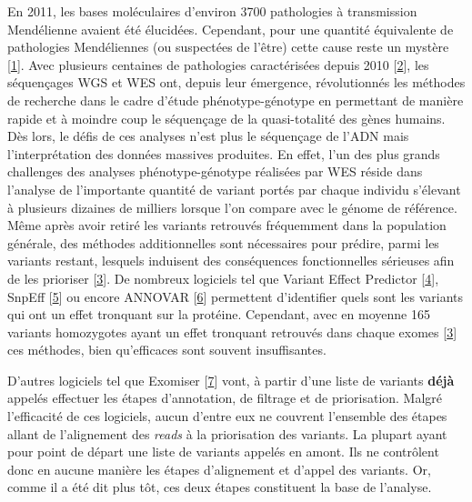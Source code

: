 \documentclass[12pt,twoside]{reedthesis}
\theoremstyle{definition}
\theoremstyle{definition}
\theoremstyle{remark}
\begin{document}
  En 2011, les bases moléculaires d'environ 3700 pathologies à
  transmission Mendélienne avaient été élucidées. Cependant, pour une
  quantité équivalente de pathologies Mendéliennes (ou suspectées de
  l'être) cette cause reste un mystère
  {[}\protect\hyperlink{ref-Amberger2011}{1}{]}. Avec plusieurs centaines
  de pathologies caractérisées depuis 2010
  {[}\protect\hyperlink{ref-Ng}{2}{]}, les séquençages WGS et WES ont,
  depuis leur émergence, révolutionnés les méthodes de recherche dans le
  cadre d'étude phénotype-génotype en permettant de manière rapide et à
  moindre coup le séquençage de la quasi-totalité des gènes humains. Dès
  lors, le défis de ces analyses n'est plus le séquençage de l'ADN mais
  l'interprétation des données massives produites. En effet, l'un des plus
  grands challenges des analyses phénotype-génotype réalisées par WES
  réside dans l'analyse de l'importante quantité de variant portés par
  chaque individu s'élevant à plusieurs dizaines de milliers lorsque l'on
  compare avec le génome de référence. Même après avoir retiré les
  variants retrouvés fréquemment dans la population générale, des méthodes
  additionnelles sont nécessaires pour prédire, parmi les variants
  restant, lesquels induisent des conséquences fonctionnelles sérieuses
  afin de les prioriser {[}\protect\hyperlink{ref-Pelak2010}{3}{]}. De
  nombreux logiciels tel que Variant Effect Predictor
  {[}\protect\hyperlink{ref-McLaren2016}{4}{]}, SnpEff
  {[}\protect\hyperlink{ref-Cingolani2012}{5}{]} ou encore ANNOVAR
  {[}\protect\hyperlink{ref-Wang2010}{6}{]} permettent d'identifier quels
  sont les variants qui ont un effet tronquant sur la protéine. Cependant,
  avec en moyenne 165 variants homozygotes ayant un effet tronquant
  retrouvés dans chaque exomes {[}\protect\hyperlink{ref-Pelak2010}{3}{]}
  ces méthodes, bien qu'efficaces sont souvent insuffisantes.
  
  D'autres logiciels tel que Exomiser
  {[}\protect\hyperlink{ref-Robinson2014}{7}{]} vont, à partir d'une liste
  de variants \textbf{déjà} appelés effectuer les étapes d'annotation, de
  filtrage et de priorisation. Malgré l'efficacité de ces logiciels, aucun
  d'entre eux ne couvrent l'ensemble des étapes allant de l'alignement des
  \emph{reads} à la priorisation des variants. La plupart ayant pour point
  de départ une liste de variants appelés en amont. Ils ne contrôlent donc
  en aucune manière les étapes d'alignement et d'appel des variants. Or,
  comme il a été dit plus tôt, ces deux étapes constituent la base de
  l'analyse.
  
\end{document}
